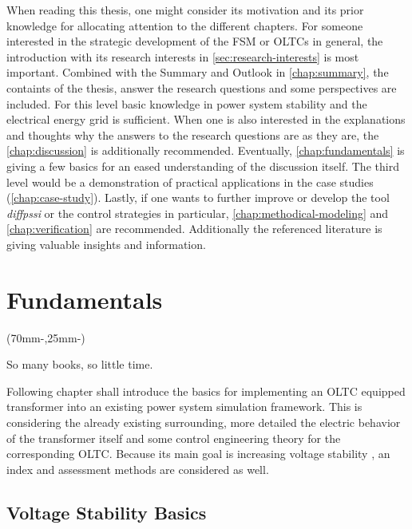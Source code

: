 When reading this thesis, one might consider its motivation and its prior knowledge for allocating attention to the different chapters.
For someone interested in the strategic development of the \acs{FSM} or \acsp{OLTC} in general, the introduction with its research interests in \autoref{sec:research-interests} is most important. 
Combined with the Summary and Outlook in \autoref{chap:summary}, the containts of the thesis, answer the research questions and some perspectives are included.
For this level basic knowledge in power system stability and the electrical energy grid is sufficient.
When one is also interested in the explanations and thoughts why the answers to the research questions are as they are, the  \autoref{chap:discussion} is additionally recommended. 
Eventually, \autoref{chap:fundamentals} is giving a few basics for an eased understanding of the discussion itself.
The third level would be a demonstration of practical applications in the case studies (\autoref{chap:case-study}).
Lastly, if one wants to further improve or develop the tool {\itshape diffpssi} or the control strategies in particular, \autoref{chap:methodical-modeling} and \autoref{chap:verification} are recommended.
Additionally the referenced literature is giving valuable insights and information.

\chapter{Fundamentals}
\label{chap:fundamentals}

\begin{textblock*}{.7\textwidth}(70mm-\offset,25mm-\offset)
    \begin{fquote}
        So many books, so little time.
    \end{fquote}
\end{textblock*}

Following chapter shall introduce the basics for implementing an \acs{OLTC} equipped transformer into an existing power system simulation framework.
This is considering the already existing surrounding, more detailed the electric behavior of the transformer itself and some control engineering theory for the corresponding \acs{OLTC}. 
Because its main goal is increasing voltage stability \autocite{machowski_2020}, an index and assessment methods are considered as well.

\section{Voltage Stability Basics}
\label{sec:voltage-stability}

